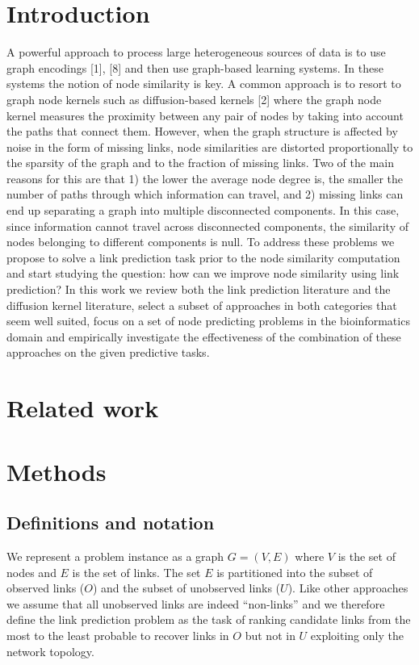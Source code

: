 \section{Introduction}
A powerful approach to process large heterogeneous sources of data is to use graph encodings [1], [8] and then use graph-based learning systems. In these systems the notion of node similarity is key. A common approach is to resort to graph node kernels such as diffusion-based kernels [2] where the graph node kernel measures the proximity between any pair of nodes by taking into account the paths that connect them. However, when the graph structure is affected by
noise in the form of missing links, node similarities are distorted proportionally to the sparsity of the graph and to the fraction of missing links. Two of the main reasons for this are that 1) the lower the average node degree is, the smaller the number of paths through which information can travel, and 2) missing links can end up separating a graph into multiple disconnected components. In this case, since information cannot travel across disconnected components, the similarity of nodes belonging to different components is null. To address these problems we propose to solve a link prediction task prior to the node similarity computation and start studying the question: how can we improve node similarity using link prediction? In this work we review both the link prediction literature and the diffusion kernel literature, select a subset of approaches in both categories that seem well suited, focus on a set of node predicting problems in the bioinformatics domain and empirically investigate the effectiveness of the combination of these approaches on the given predictive tasks. 

\section{Related work}
\section{Methods}
\subsection{Definitions and notation}
We represent a problem instance as a graph $G=(V,E)$ where $V$ is the set of nodes and $E$ is the set of links. The set $E$ is partitioned into the subset of observed links ($O$) and the subset of unobserved links ($U$). Like other approaches we assume that all unobserved links are indeed ``non-links'' and we therefore define the link prediction problem as the task of ranking candidate links from the most to the least probable to recover links in $O$ but not in $U$ exploiting only the network topology.


